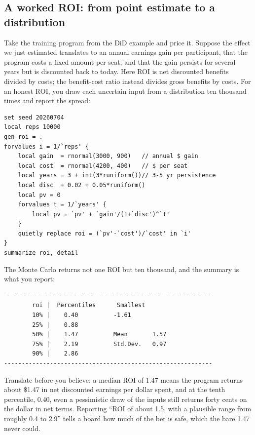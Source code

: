 \documentclass[
    a4paper,
    fontsize=10pt,
    twoside=true,
    numbers=noenddot,
]{kaobook}
\begin{document}
\subsection{A worked ROI: from point estimate to a distribution}
Take the training program from the DiD example and price it. Suppose the effect we just estimated translates to an annual earnings gain per participant, that the program costs a fixed amount per seat, and that the gain persists for several years but is discounted back to today. Here ROI is net discounted benefits divided by costs; the benefit-cost ratio instead divides gross benefits by costs. For an honest ROI, you draw each uncertain input from a distribution ten thousand times and report the spread:
\par
{\footnotesize
\begin{verbatim}
set seed 20260704
local reps 10000
gen roi = .
forvalues i = 1/`reps' {
    local gain  = rnormal(3000, 900)   // annual $ gain
    local cost  = rnormal(4200, 400)   // $ per seat
    local years = 3 + int(3*runiform())// 3-5 yr persistence
    local disc  = 0.02 + 0.05*runiform()
    local pv = 0
    forvalues t = 1/`years' {
        local pv = `pv' + `gain'/(1+`disc')^`t'
    }
    quietly replace roi = (`pv'-`cost')/`cost' in `i'
}
summarize roi, detail
\end{verbatim}
}
The Monte Carlo returns not one ROI but ten thousand, and the summary is what you report:
\par
{\footnotesize
\begin{verbatim}
-----------------------------------------------------------
        roi |  Percentiles      Smallest
        10% |    0.40          -1.61
        25% |    0.88
        50% |    1.47          Mean       1.57
        75% |    2.19          Std.Dev.   0.97
        90% |    2.86
-----------------------------------------------------------
\end{verbatim}
}
Translate before you believe: a median ROI of 1.47 means the program returns about \$1.47 in net discounted earnings per dollar spent, and at the tenth percentile, 0.40, even a pessimistic draw of the inputs still returns forty cents on the dollar in net terms. Reporting \enquote{ROI of about 1.5, with a plausible range from roughly 0.4 to 2.9} tells a board how much of the bet is safe, which the bare 1.47 never could.
\end{document}
